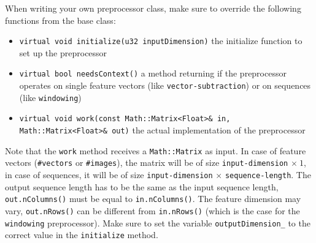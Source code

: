 When writing your own preprocessor class, make sure to override the following functions from the base class:
\begin{itemize}
    \item \texttt{virtual void initialize(u32 inputDimension)} the initialize function to set up the preprocessor
    \item \texttt{virtual bool needsContext()} a method returning if the preprocessor operates on single feature vectors (like \texttt{vector-subtraction}) or on sequences (like \texttt{windowing})
    \item \texttt{virtual void work(const Math::Matrix<Float>\& in, Math::Matrix<Float>\& out)} the actual implementation of the preprocessor
\end{itemize}
Note that the \texttt{work} method receives a \texttt{Math::Matrix} as input. In case of feature vectors (\texttt{\#vectors} or \texttt{\#images}), the matrix will be of size \texttt{input-dimension} $ \times \ 1 $, in case of sequences, it will be of size \texttt{input-dimension} $ \times $ \texttt{sequence-length}. The output sequence length has to be the same as the input sequence length, \ie \texttt{out.nColumns()} must be equal to \texttt{in.nColumns()}. The feature dimension may vary, \ie \texttt{out.nRows()} can be different from \texttt{in.nRows()} (which is the case \eg for the \texttt{windowing} preprocessor). Make sure to set the variable \texttt{outputDimension\_} to the correct value in the \texttt{initialize} method.

